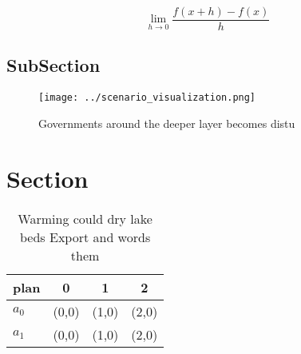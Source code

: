 \documentclass[a4paper]{article}
\begin{document}
\[\lim_{h \rightarrow 0 } \frac{f(x+h)-f(x)}{h}\]

\subsection{SubSection}

\begin{figure}
\centering
\texttt{[image: ../scenario\_visualization.png]}
\caption{Governments around the deeper layer becomes distu
}
\end{figure}
 
\section{Section}

\begin{table}
\begin{adjustbox}{width=0.5\columnwidth}
\begin{tabular}{|l|l|l|l|}
\hline
\textbf{plan} & \multicolumn{1}{c|}{\textbf{0}} & \multicolumn{1}{c|}{\textbf{1}} & \multicolumn{1}{c|}{\textbf{2}} \\ \hline
\textbf{$a_0$}  & (0,0) & (1,0) & (2,0) \\ \hline
\textbf{$a_1$}  & (0,0) & (1,0) & (2,0) \\ \hline
\end{tabular}
\end{adjustbox}
\caption{Warming could dry lake beds Export and words them
}
\end{table}
\end{document}
